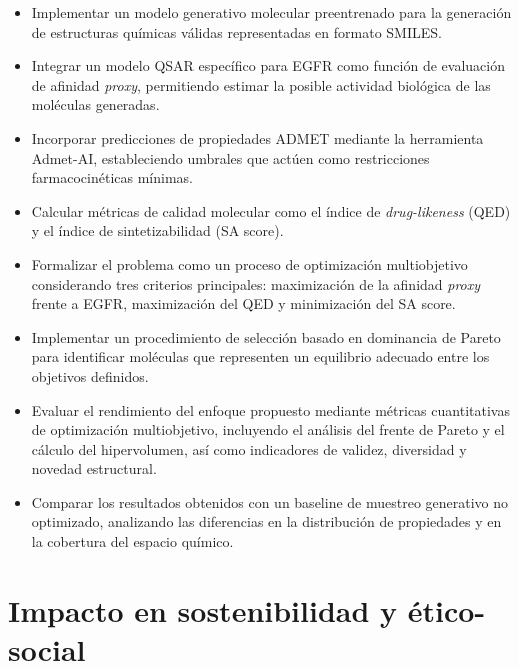 \documentclass[IB]{TFUOC}%
\begin{document}
\begin{itemize}

    \item Implementar un modelo generativo molecular preentrenado para la generación de estructuras químicas válidas representadas en formato SMILES.

    \item Integrar un modelo QSAR específico para EGFR como función de evaluación de afinidad \textit{proxy}, permitiendo estimar la posible actividad biológica de las moléculas generadas.

    \item Incorporar predicciones de propiedades ADMET mediante la herramienta Admet-AI, estableciendo umbrales que actúen como restricciones farmacocinéticas mínimas.

    \item Calcular métricas de calidad molecular como el índice de \textit{drug-likeness} (QED) y el índice de sintetizabilidad (SA score).

    \item Formalizar el problema como un proceso de optimización multiobjetivo considerando tres criterios principales: maximización de la afinidad \textit{proxy} frente a EGFR, maximización del QED y minimización del SA score.

    \item Implementar un procedimiento de selección basado en dominancia de Pareto para identificar moléculas que representen un equilibrio adecuado entre los objetivos definidos.

    \item Evaluar el rendimiento del enfoque propuesto mediante métricas cuantitativas de optimización multiobjetivo, incluyendo el análisis del frente de Pareto y el cálculo del hipervolumen, así como indicadores de validez, diversidad y novedad estructural.

    \item Comparar los resultados obtenidos con un baseline de muestreo generativo no optimizado, analizando las diferencias en la distribución de propiedades y en la cobertura del espacio químico.

\end{itemize}

\section{Impacto en sostenibilidad y ético-social}
\label{s:etic}
\end{document}
